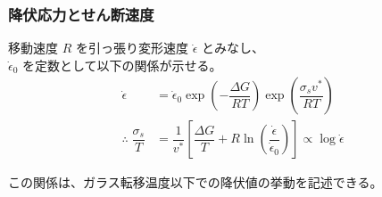 \documentclass[1４pt, dvipdfmx]{beamer}
\begin{document}
\begin{frame}
\frametitle{降伏応力とせん断速度}

\large
移動速度 $R$ を引っ張り変形速度 $\dot{\epsilon}$ とみなし、\\ $\dot{\epsilon}_0$ を定数として以下の関係が示せる。
\normalsize
	\begin{align*}
	\dot{\epsilon} 
	&= \dot{\epsilon}_0 \exp \left( - \dfrac{\Delta G}{RT} \right) 
		\exp \left( \dfrac{ \sigma_s v^*}{RT} \right) \\
	\therefore \; \dfrac{\sigma_s}{T} 
	&= \dfrac{1}{v^*} 
		\left[
			\dfrac{\Delta G}{T} 
			+ R \ln 
			\left(
			\dfrac{\dot{\epsilon}}{\dot{\epsilon}_0} 
			\right) 
		\right] 
	\propto \log \dot{\epsilon}
	\end{align*}

\large

この関係は、ガラス転移温度以下での降伏値の挙動を記述できる。
\end{frame}
\end{document}
